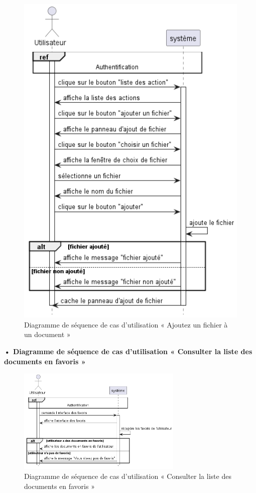 \begin{figure}[H]
  \centering
  \includegraphics[width=1\textwidth]{out/diagrams/documents/add_file/add_file}
  \caption{Diagramme de séquence de cas d'utilisation « Ajoutez un fichier à un document  »}
  \label{fig:sequence_add_file}
\end{figure}
\textbf{•	Diagramme de séquence de cas d'utilisation « Consulter la liste des documents en favoris  »}
\begin{figure}[H]
  \centering
  \includegraphics[width=0.7\textwidth]{out/diagrams/documents/favoris/favorit_document}
  \caption{Diagramme de séquence de cas d'utilisation « Consulter la liste des documents en favoris  »}
  \label{fig:sequence_favorit_document}
\end{figure}
